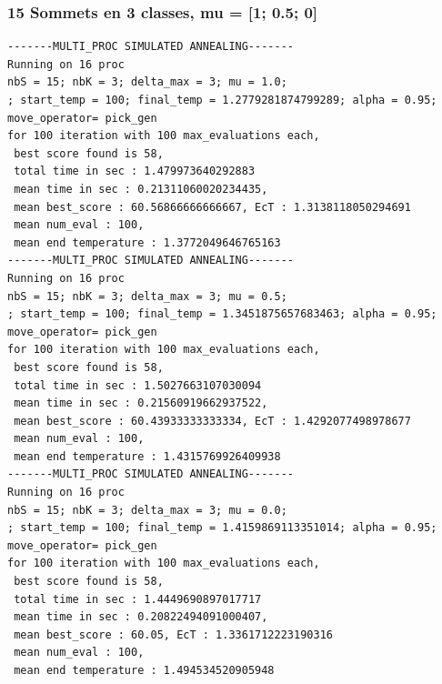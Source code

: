 \documentclass[a4paper]{article}
\begin{document}
\subsubsection{15 Sommets en 3 classes, mu = [1; 0.5; 0]}
\begin{verbatim}
-------MULTI_PROC SIMULATED ANNEALING-------
Running on 16 proc
nbS = 15; nbK = 3; delta_max = 3; mu = 1.0;
; start_temp = 100; final_temp = 1.2779281874799289; alpha = 0.95; move_operator= pick_gen
for 100 iteration with 100 max_evaluations each, 
 best score found is 58,
 total time in sec : 1.479973640292883
 mean time in sec : 0.21311060020234435,
 mean best_score : 60.56866666666667, EcT : 1.3138118050294691
 mean num_eval : 100,
 mean end temperature : 1.3772049646765163
-------MULTI_PROC SIMULATED ANNEALING-------
Running on 16 proc
nbS = 15; nbK = 3; delta_max = 3; mu = 0.5;
; start_temp = 100; final_temp = 1.3451875657683463; alpha = 0.95; move_operator= pick_gen
for 100 iteration with 100 max_evaluations each, 
 best score found is 58,
 total time in sec : 1.5027663107030094
 mean time in sec : 0.21560919662937522,
 mean best_score : 60.43933333333334, EcT : 1.4292077498978677
 mean num_eval : 100,
 mean end temperature : 1.4315769926409938
-------MULTI_PROC SIMULATED ANNEALING-------
Running on 16 proc
nbS = 15; nbK = 3; delta_max = 3; mu = 0.0;
; start_temp = 100; final_temp = 1.4159869113351014; alpha = 0.95; move_operator= pick_gen
for 100 iteration with 100 max_evaluations each, 
 best score found is 58,
 total time in sec : 1.4449690897017717
 mean time in sec : 0.20822494091000407,
 mean best_score : 60.05, EcT : 1.3361712223190316
 mean num_eval : 100,
 mean end temperature : 1.494534520905948
\end{verbatim}
\end{document}
